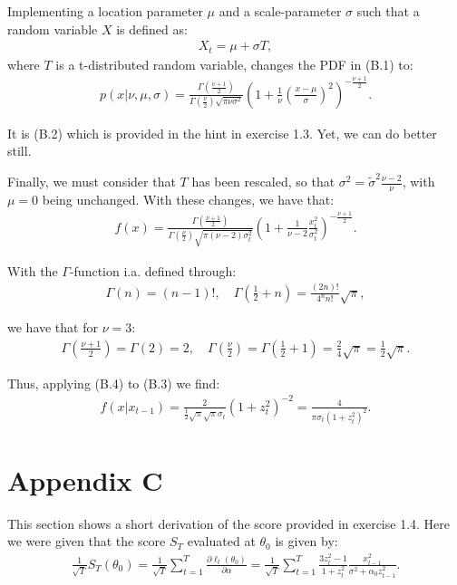 \documentclass[11pt,a4paper,oneside]{article}
\newcommand{\lp}{\left(}
\newcommand{\rp}{\right)}
\newcommand{\sumt}{\sum_{t=1}^T}
\begin{document}
Implementing a location parameter $\mu$ and a scale-parameter $\sigma$ such that a random variable $X$ is defined as:
\begin{align*}
    X_t = \mu + \sigma T,
\end{align*}
where $T$ is a t-distributed random variable, changes the PDF in (B.1) to:
\begin{align}
    p\lp x \vert \nu, \mu, \sigma\rp = \frac{\Gamma\lp \frac{\nu + 1}{2}\rp}{\Gamma \lp \frac{\nu}{2}\rp \sqrt{\pi\nu\sigma^2}}\lp 1 + \frac{1}{\nu}\lp \frac{x - \mu}{\sigma}\rp^2\rp^{-\frac{\nu + 1}{2}}.
\end{align}

It is (B.2) which is provided in the hint in exercise 1.3. Yet, we can do better still.

Finally, we must consider that $T$ has been rescaled, so that $\sigma^2 = \tilde \sigma^2 \frac{\nu - 2}{\nu}$, with $\mu = 0$ being unchanged. With these changes, we have that:
\begin{align*}
    f\lp x\rp = \frac{\Gamma\lp \frac{\nu + 1}{2}\rp}{\Gamma\lp \frac{\nu}{2}\rp\sqrt{\pi\lp \nu - 2\rp \sigma_t^2}}\lp 1 + \frac{1}{\nu - 2}\frac{x_t^2}{\sigma_t^2}\rp^{-\frac{\nu + 1}{2}}.
\end{align*}

With the $\Gamma$-function i.a. defined through:
\begin{align*}
    \Gamma\lp n\rp = \lp n - 1\rp!, \quad \Gamma \lp \frac{1}{2} + n\rp = \frac{\lp 2 n\rp !}{4^n n!}\sqrt{\pi},
\end{align*}

we have that for $\nu = 3$:
\begin{align}
    \Gamma\lp \frac{\nu + 1}{2}\rp = \Gamma \lp 2\rp = 2, \quad \Gamma \lp \frac{\nu}{2}\rp = \Gamma \lp \frac{1}{2} + 1\rp = \frac{2}{4}\sqrt{\pi} = \frac{1}{2}\sqrt{\pi}.
\end{align}

Thus, applying (B.4) to (B.3) we find:
\begin{align}
    f\lp x\vert x_{t-1}\rp 
        = \frac{2}{\frac{1}{2}\sqrt{\pi} \sqrt{\pi}\sigma_t}\lp 1 + z_t^2\rp^{-2}
        = \frac{4}{\pi\sigma_t\lp 1 + z_t^2\rp^2}.
\end{align}

\clearpage

\section{Appendix C}
\renewcommand{\theequation}{C.\arabic{equation}}
\setcounter{equation}{0}
This section shows a short derivation of the score provided in exercise 1.4. Here we were given that the score $S_T$ evaluated at $\theta_0$ is given by:
\begin{align*}
    \frac{1}{\sqrt{T}} S_T\lp \theta_0\rp
        = \frac{1}{\sqrt{T}}\sumt \frac{\partial \ell_t\lp \theta_0\rp}{\partial \alpha}
        = \frac{1}{\sqrt{T}}\sumt \frac{3z_t^2 - 1}{1 + z_t^2}\frac{x_{t-1}^2}{\sigma^2 + \alpha_0 z_{t-1}^2}.
\end{align*}
\end{document}
